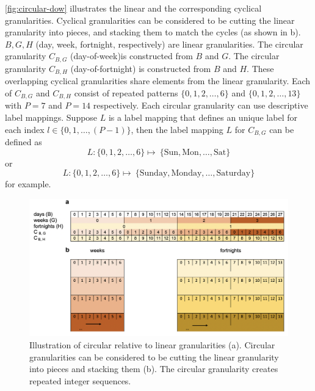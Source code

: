 \documentclass[12pt]{article}
\begin{document}
\begin{example}
{\rm \autoref{fig:circular-dow} illustrates the linear and the corresponding cyclical granularities. Cyclical granularities can be considered to be cutting the linear granularity into pieces, and stacking them to match the cycles (as shown in b). $B, G, H$ (day, week, fortnight, respectively) are linear granularities. The circular granularity $C_{B , G}$ (day-of-week)is constructed from $B$ and  $G$. The circular granularity $C_{B, H}$ (day-of-fortnight) is constructed from $B$ and $H$. These overlapping cyclical granularities share elements from the linear granularity. Each of $C_{B , G}$ and $C_{B , H}$ consist of repeated patterns  $\{0, 1, 2, \dots, 6\}$ and $\{0, 1, 2, \dots, 13\}$ with $P=7$ and $P=14$ respectively. Each circular granularity can use descriptive label mappings. Suppose ${L}$ is a label mapping that defines an unique label for each index $l \in \{ 0,1,\dots, (P-1)\}$, then the label mapping $L$ for $C_{B, G}$ can be defined as
$$
  L: \{0,1,2, \dots, 6\} \longmapsto\ \{\text{Sun}, \text{Mon}, \dots, \text{Sat}\}
$$
or
$$
  L: \{0,1,2, \dots, 6\} \longmapsto\ \{\text{Sunday}, \text{Monday}, \dots, \text{Saturday}\}
$$
for example.}
\end{example}

\begin{figure}

{\centering \includegraphics[width=1\linewidth]{Figs/circular-ex} 

}

\caption{Illustration of circular relative to linear granularities (a). Circular granularities can be considered to be cutting the linear granularity into pieces and stacking them (b). The circular granularity creates repeated integer sequences.}\label{fig:circular-dow}
\end{figure}
\end{document}
